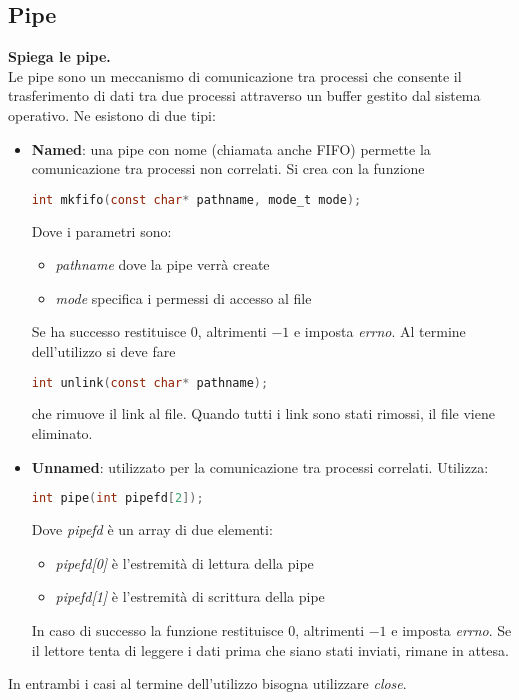 \subsection{Pipe}
\textbf{Spiega le pipe.}\\
Le pipe sono un meccanismo di comunicazione tra processi che consente il trasferimento di dati tra due processi attraverso un buffer gestito dal sistema operativo.
Ne esistono di due tipi:
\begin{itemize}
	\item \textbf{Named}: una pipe con nome (chiamata anche FIFO) permette la comunicazione tra processi non correlati. Si crea con la funzione
	\begin{lstlisting}[language=C]
		int mkfifo(const char* pathname, mode_t mode);
	\end{lstlisting}
	Dove i parametri sono:
	\begin{itemize}
		\item \textit{pathname} dove la pipe verrà create
		\item \textit{mode} specifica i permessi di accesso al file
	\end{itemize}
	Se ha successo restituisce $0$, altrimenti $-1$ e imposta \textit{errno}. Al termine dell'utilizzo si deve fare
	\begin{lstlisting}[language=C]
		int unlink(const char* pathname);
	\end{lstlisting}
	che rimuove il link al file. Quando tutti i link sono stati rimossi, il file viene eliminato.
	\item \textbf{Unnamed}: utilizzato per la comunicazione tra processi correlati. Utilizza:
	\begin{lstlisting}[language=C]
		int pipe(int pipefd[2]);
	\end{lstlisting}
	Dove \textit{pipefd} è un array di due elementi:
	\begin{itemize}
		\item \textit{pipefd[0]} è l'estremità di lettura della pipe
		\item \textit{pipefd[1]} è l'estremità di scrittura della pipe
	\end{itemize}
	In caso di successo la funzione restituisce $0$, altrimenti $-1$ e imposta \textit{errno}. Se il lettore tenta di leggere i dati prima che siano stati inviati, rimane in attesa.
\end{itemize}
In entrambi i casi al termine dell'utilizzo bisogna utilizzare \textit{close}.